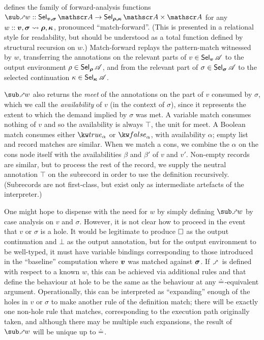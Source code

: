  defines the family of forward-analysis functions $\matchFwdF{w} :: \Sel{v, \sigma}{A} \to \Prod{\Sel{\rho, \kappa}{A}}{\Ann{A}}$ for any $w :: \bm{v}, \bm{\sigma} \rightsquigarrow \bm{\rho}, \bm{\kappa}$, pronounced ``match-forward''. (This is presented in a relational style for readability, but should be understood as a total function defined by structural recursion on $w$.) Match-forward replays the pattern-match witnessed by $w$, transferring the annotations on the relevant parts of $v \in \textup{\textsf{Sel}}_{\bm{v}}\,{\mathscr{A}}$ to the output environment $\rho \in \textup{\textsf{Sel}}_{\bm{\rho}}\,{\mathscr{A}}$, and from the relevant part of $\sigma \in \textup{\textsf{Sel}}_{\bm{\sigma}}\,{\mathscr{A}}$ to the selected continuation $\kappa \in \textup{\textsf{Sel}}_{\bm{\kappa}}\,{\mathscr{A}}$.

$\matchFwdF{w}$ also returns the \emph{meet} of the annotations on the part of $v$ consumed by $\sigma$, which we call the \emph{availability} of $v$ (in the context of $\sigma$), since it represents the extent to which the demand implied by $\sigma$ was met. A variable match consumes nothing of $v$ and so the availability is always $\top$, the unit for meet. A Boolean match consumes either $\annot{\exTrue}{\alpha}$ or $\annot{\exFalse}{\alpha}$, with availability $\alpha$; empty list and record matches are similar. When we match a cons, we combine the $\alpha$ on the cons node itself with the availabilities $\beta$ and $\beta'$ of $v$ and $v'$. Non-empty records are similar, but to process the rest of the record, we supply the neutral annotation $\top$ on the subrecord in order to use the definition recursively. (Subrecords are not first-class, but exist only as intermediate artefacts of the interpreter.)

One might hope to dispense with the need for $w$ by simply defining $\matchFwdF{w}$ by case analysis on $v$ and $\sigma$. However, it is not clear how to proceed in the event that $v$ or $\sigma$ is a hole. It would be legitimate to produce $\square$ as the output continuation and $\bot$ as the output annotation, but for the output environment to be well-typed, it must have variable bindings corresponding to those introduced in the ``baseline'' computation where $\bm{v}$ was matched against $\bm{\sigma}$. If $\matchFwdS$ is defined with respect to a known $w$, this can be achieved via additional rules  and  that define the behaviour at hole to be the same as the behaviour at any $\doteq$-equivalent argument. Operationally, this can be interpreted as ``expanding'' enough of the holes in $v$ or $\sigma$ to make another rule of the definition match; there will be exactly one non-hole rule that matches, corresponding to the execution path originally taken, and although there may be multiple such expansions, the result of $\matchFwdF{w}$ will be unique up to $\doteq$.

